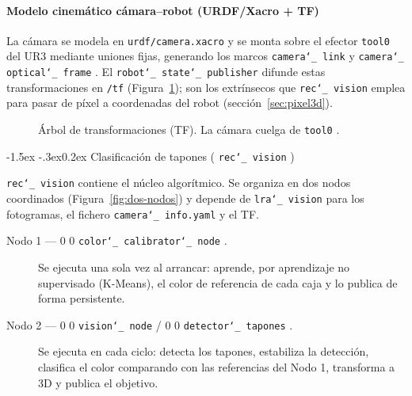 \documentclass[12pt,a4paper]{article}
\makeatletter
\renewcommand\subsubsection{\@startsection{subsubsection}{3}{\z@}%
  {-1.5ex \@plus -.3ex}{0.2ex}%
  {\normalsize\bfseries\color{MediumBlue}}}
\newcommand{\code}[1]{%
  \begingroup
  \def\_{\char`_\penalty0 }%
  \def\/{\char`/\penalty0 }%
  \texttt{\small #1}%
  \endgroup}
\makeatother
\begin{document}
\paragraph{Modelo cinemático cámara--robot (URDF/Xacro + TF)}
\label{sec:tf}

La cámara se modela en \code{urdf/camera.xacro} y se monta sobre el efector
\code{tool0} del UR3 mediante uniones fijas, generando los marcos
\code{camera\_link} y \code{camera\_optical\_frame}. El
\code{robot\_state\_publisher} difunde estas transformaciones en \code{/tf}
(Figura~\ref{fig:tf}); son los extrínsecos que \code{rec\_vision}
emplea para pasar de píxel a coordenadas del robot (sección~\ref{sec:pixel3d}).

\begin{figure}[H]
\centering
{}
\caption{Árbol de transformaciones (TF). La cámara cuelga de \code{tool0}.}
\label{fig:tf}
\end{figure}


\subsubsection{Clasificación de tapones (\texorpdfstring{\code{rec\_vision}}{rec\_vision})}
\label{sec:rec-vision}

\code{rec\_vision} contiene el núcleo algorítmico. Se organiza en dos nodos coordinados (Figura~\ref{fig:dos-nodos})
y depende de \code{lra\_vision} para los fotogramas, el fichero
\code{camera\_info.yaml} y el TF.

\clearpage
\begin{description}
\item[Nodo 1 --- \code{color\_calibrator\_node}.] Se ejecuta una sola vez
al arrancar: aprende, por aprendizaje no supervisado (K-Means), el color de
referencia de cada caja y lo publica de forma persistente.
\item[Nodo 2 --- \code{vision\_node} / \code{detector\_tapones}.] Se ejecuta en
cada ciclo: detecta los tapones, estabiliza la detección, clasifica el color
comparando con las referencias del Nodo 1, transforma a 3D y publica el objetivo.
\end{description}
\end{document}

